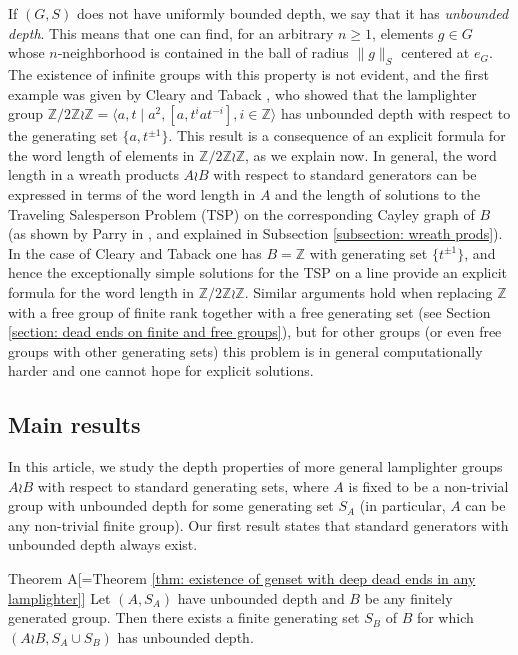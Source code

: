 \documentclass[reqno,oneside]{amsart}
\newcommand{\Z}{\mathbb{Z}}
\newcommand{\thistheoremname}{}
\newtheorem*{genericthm*}{\thistheoremname}
\newenvironment{namedthm*}[1]
{\renewcommand{\thistheoremname}{#1}%
	\begin{genericthm*}}
	{\end{genericthm*}}
\theoremstyle{plain}
\theoremstyle{definition}
\begin{document}
If $(G,S)$ does not have uniformly bounded depth, we say that it has \textit{unbounded depth}. This means that one can find, for an arbitrary $n\ge 1$, elements $g\in G$ whose $n$-neighborhood is contained in the ball of radius $\|g\|_S$ centered at $e_G$. The existence of infinite groups with this property is not evident, and the first example was given by Cleary and Taback \cite{ClearyTaback05}, who showed that the lamplighter group $\Z/2\Z\wr \Z=\langle a,t\mid a^2, [a,t^iat^{-i}], i\in \mathbb{Z} \rangle$ has unbounded depth with respect to the generating set $\{a,t^{\pm 1}\}$. This result is a consequence of an explicit formula for the word length of elements in $\Z/2\Z\wr \Z$, as we explain now. In general, the word length in a wreath products $A\wr B$ with respect to standard generators can be expressed in terms of the word length in $A$ and the length of solutions to the Traveling Salesperson Problem (TSP) on the corresponding Cayley graph of $B$ (as shown by Parry in \cite{Parry1992}, and explained in Subsection \ref{subsection: wreath prods}). In the case of Cleary and Taback one has $B=\Z$ with generating set $\{t^{\pm 1}\}$, and hence the exceptionally simple solutions for the TSP on a line provide an explicit formula for the word length in $\Z/2\Z\wr \Z$. Similar arguments hold when replacing $\Z$ with a free group of finite rank together with a free generating set (see Section \ref{section: dead ends on finite and free groups}), but for other groups (or even free groups with other generating sets) this problem is in general computationally harder and one cannot hope for explicit solutions.
\subsection{Main results}

In this article, we study the depth properties of more general lamplighter groups $A\wr B$ with respect to standard generating sets, where $A$ is fixed to be a non-trivial group with unbounded depth for some generating set $S_A$ (in particular, $A$ can be any non-trivial finite group). Our first result states that standard generators with unbounded depth always exist.

\begin{namedthm*}{Theorem A}[\;=\;Theorem \ref{thm: existence of genset with deep dead ends in any lamplighter}] \label{thm: Theorem A}
	Let $(A,S_A)$ have unbounded depth and $B$ be any finitely generated group. Then there exists a finite generating set $S_B$ of $B$ for which $(A\wr B,S_A\cup S_B)$ has unbounded depth.
\end{namedthm*}
\end{document}

